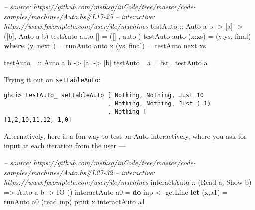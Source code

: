 \documentclass[]{article}
\newenvironment{Shaded}{}{}
\newcommand{\KeywordTok}[1]{\textcolor[rgb]{0.00,0.44,0.13}{\textbf{{#1}}}}
\newcommand{\DataTypeTok}[1]{\textcolor[rgb]{0.56,0.13,0.00}{{#1}}}
\newcommand{\CommentTok}[1]{\textcolor[rgb]{0.38,0.63,0.69}{\textit{{#1}}}}
\newcommand{\OtherTok}[1]{\textcolor[rgb]{0.00,0.44,0.13}{{#1}}}
\newcommand{\FunctionTok}[1]{\textcolor[rgb]{0.02,0.16,0.49}{{#1}}}
\newcommand{\NormalTok}[1]{{#1}}
\begin{document}
\begin{Shaded}
\begin{Highlighting}[]
\CommentTok{-- source: https://github.com/mstksg/inCode/tree/master/code-samples/machines/Auto.hs#L17-25}
\CommentTok{-- interactive: https://www.fpcomplete.com/user/jle/machines}
\OtherTok{testAuto ::} \DataTypeTok{Auto} \NormalTok{a b }\OtherTok{->} \NormalTok{[a] }\OtherTok{->} \NormalTok{([b], }\DataTypeTok{Auto} \NormalTok{a b)}
\NormalTok{testAuto auto []      }\FunctionTok{=} \NormalTok{([]  , auto )}
\NormalTok{testAuto auto (x}\FunctionTok{:}\NormalTok{xs)  }\FunctionTok{=} \NormalTok{(y}\FunctionTok{:}\NormalTok{ys, final)}
  \KeywordTok{where}
    \NormalTok{(y,  next ) }\FunctionTok{=} \NormalTok{runAuto  auto x}
    \NormalTok{(ys, final) }\FunctionTok{=} \NormalTok{testAuto next xs}

\OtherTok{testAuto_ ::} \DataTypeTok{Auto} \NormalTok{a b }\OtherTok{->} \NormalTok{[a] }\OtherTok{->} \NormalTok{[b]}
\NormalTok{testAuto_ a }\FunctionTok{=} \NormalTok{fst }\FunctionTok{.} \NormalTok{testAuto a}
\end{Highlighting}
\end{Shaded}

Trying it out on \texttt{settableAuto}:

\begin{verbatim}
ghci> testAuto_ settableAuto [ Nothing, Nothing, Just 10
                             , Nothing, Nothing, Just (-1)
                             , Nothing ]
[1,2,10,11,12,-1,0]
\end{verbatim}

Alternatively, here is a fun way to test an Auto interactively, where you ask
for input at each iteration from the user ---

\begin{Shaded}
\begin{Highlighting}[]
\CommentTok{-- source: https://github.com/mstksg/inCode/tree/master/code-samples/machines/Auto.hs#L27-32}
\CommentTok{-- interactive: https://www.fpcomplete.com/user/jle/machines}
\OtherTok{interactAuto ::} \NormalTok{(}\DataTypeTok{Read} \NormalTok{a, }\DataTypeTok{Show} \NormalTok{b) }\OtherTok{=>} \DataTypeTok{Auto} \NormalTok{a b }\OtherTok{->} \DataTypeTok{IO} \NormalTok{()}
\NormalTok{interactAuto a0 }\FunctionTok{=} \KeywordTok{do}
    \NormalTok{inp }\OtherTok{<-} \NormalTok{getLine}
    \KeywordTok{let} \NormalTok{(x,a1) }\FunctionTok{=} \NormalTok{runAuto a0 (read inp)}
    \NormalTok{print x}
    \NormalTok{interactAuto a1}
\end{Highlighting}
\end{Shaded}
\end{document}
